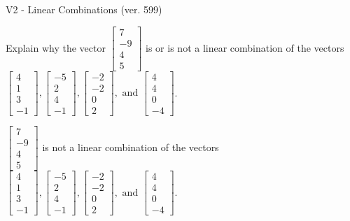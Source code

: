 \begin{exercise}
  \begin{exerciseTitle}V2 - Linear Combinations (ver. 599)\end{exerciseTitle}
  \begin{exerciseStatement}
    Explain why the vector \(\left[\begin{array}{c}
7 \\
-9 \\
4 \\
5
\end{array}\right]\)  is or is not a linear 
	combination of the vectors \(\left[\begin{array}{c}
4 \\
1 \\
3 \\
-1
\end{array}\right] , \left[\begin{array}{c}
-5 \\
2 \\
4 \\
-1
\end{array}\right] , \left[\begin{array}{c}
-2 \\
-2 \\
0 \\
2
\end{array}\right] , \text{ and } \left[\begin{array}{c}
4 \\
4 \\
0 \\
-4
\end{array}\right]\).
	


  \end{exerciseStatement}
  \begin{exerciseAnswer}
   \(\left[\begin{array}{c}
7 \\
-9 \\
4 \\
5
\end{array}\right]\) 
  	 is not  
	a linear combination of the vectors \(\left[\begin{array}{c}
4 \\
1 \\
3 \\
-1
\end{array}\right] , \left[\begin{array}{c}
-5 \\
2 \\
4 \\
-1
\end{array}\right] , \left[\begin{array}{c}
-2 \\
-2 \\
0 \\
2
\end{array}\right] , \text{ and } \left[\begin{array}{c}
4 \\
4 \\
0 \\
-4
\end{array}\right]\).


\end{exerciseAnswer}
\end{exercise}
